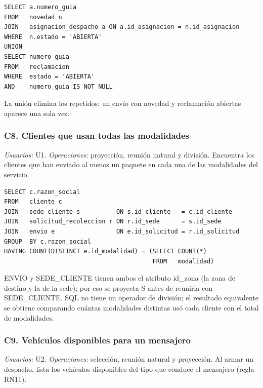 \begin{lstlisting}[style=sqlpro]
SELECT a.numero_guia
FROM   novedad n
JOIN   asignacion_despacho a ON a.id_asignacion = n.id_asignacion
WHERE  n.estado = 'ABIERTA'
UNION
SELECT numero_guia
FROM   reclamacion
WHERE  estado = 'ABIERTA'
AND    numero_guia IS NOT NULL
\end{lstlisting}
La unión elimina los repetidos: un envío con novedad y reclamación abiertas aparece una sola vez.


\subsubsection{C8. Clientes que usan todas las modalidades}
\label{q:C8}
\textit{Usuarios:} U1. \textit{Operaciones:} proyección, reunión natural y división. Encuentra los clientes que han enviado al menos un paquete en cada una de las modalidades del servicio.

\begin{center}\end{center}

\begin{lstlisting}[style=sqlpro]
SELECT c.razon_social
FROM   cliente c
JOIN   sede_cliente s          ON s.id_cliente   = c.id_cliente
JOIN   solicitud_recoleccion r ON r.id_sede      = s.id_sede
JOIN   envio e                 ON e.id_solicitud = r.id_solicitud
GROUP  BY c.razon_social
HAVING COUNT(DISTINCT e.id_modalidad) = (SELECT COUNT(*)
                                         FROM   modalidad)
\end{lstlisting}
ENVIO y SEDE\_CLIENTE tienen ambos el atributo id\_zona (la zona de destino y la de la sede); por eso se proyecta S antes de reunirla con SEDE\_CLIENTE. SQL no tiene un operador de división; el resultado equivalente se obtiene comparando cuántas modalidades distintas usó cada cliente con el total de modalidades.


\subsubsection{C9. Vehículos disponibles para un mensajero}
\label{q:C9}
\textit{Usuarios:} U2. \textit{Operaciones:} selección, reunión natural y proyección. Al armar un despacho, lista los vehículos disponibles del tipo que conduce el mensajero (regla RN11).

